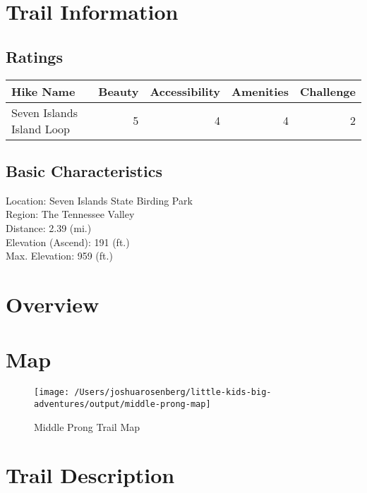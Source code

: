 \documentclass[
]{book}
\begin{document}
\hypertarget{trail-information-13}{%
\section{Trail Information}\label{trail-information-13}}

\hypertarget{ratings-9}{%
\subsection{Ratings}\label{ratings-9}}

\begin{tabular}{l|r|r|r|r}
\hline
Hike Name & Beauty & Accessibility & Amenities & Challenge\\
\hline
Seven Islands Island Loop & 5 & 4 & 4 & 2\\
\hline
\end{tabular}

\hypertarget{basic-characteristics-13}{%
\subsection{Basic Characteristics}\label{basic-characteristics-13}}

Location: Seven Islands State Birding Park\\
Region: The Tennessee Valley\\
Distance: 2.39 (mi.)\\
Elevation (Ascend): 191 (ft.)\\
Max. Elevation: 959 (ft.)

\hypertarget{overview-13}{%
\section{Overview}\label{overview-13}}

\hypertarget{map-13}{%
\section{Map}\label{map-13}}

\begin{figure}
\texttt{[image: /Users/joshuarosenberg/little-kids-big-adventures/output/middle-prong-map]} \caption{Middle Prong Trail Map}\label{fig:unnamed-chunk-49}
\end{figure}

\hypertarget{trail-description-14}{%
\section{Trail Description}\label{trail-description-14}}
\end{document}
